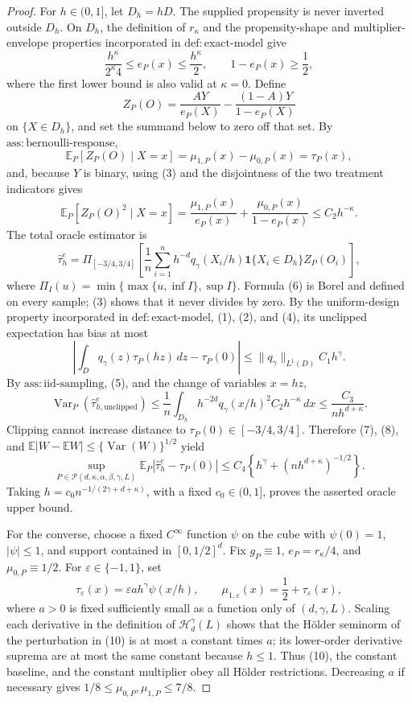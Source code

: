 \documentclass{article}
\begin{document}
\begin{proof}
For \(h\in(0,1]\), let \(D_h=hD\).  The supplied propensity is never inverted outside \(D_h\).  On \(D_h\), the definition of \(r_\kappa\) and the propensity-shape and multiplier-envelope properties incorporated in \(\mathrm{def:exact\mbox{-}model}\) give
\[
 \frac{h^\kappa}{2^\kappa4}\leq e_P(x)\leq\frac{h^\kappa}{2},
 \qquad 1-e_P(x)\geq\frac12,
 \tag{3}
\]
where the first lower bound is also valid at \(\kappa=0\).  Define
\[
 Z_P(O)=\frac{AY}{e_P(X)}-\frac{(1-A)Y}{1-e_P(X)}
\]
on \(\{X\in D_h\}\), and set the summand below to zero off that set.  By \(\mathrm{ass:bernoulli\mbox{-}response}\),
\[
 \mathbb E_P[Z_P(O)\mid X=x]=\mu_{1,P}(x)-\mu_{0,P}(x)=\tau_P(x),
 \tag{4}
\]
and, because \(Y\) is binary, using (3) and the disjointness of the two treatment indicators gives
\[
 \mathbb E_P[Z_P(O)^2\mid X=x]
 =\frac{\mu_{1,P}(x)}{e_P(x)}+\frac{\mu_{0,P}(x)}{1-e_P(x)}
 \leq C_2h^{-\kappa}.
 \tag{5}
\]
The total oracle estimator is
\[
 \widehat\tau^{e}_{h}
 =\Pi_{[-3/4,3/4]}\!\left[
 \frac1n\sum_{i=1}^nh^{-d}q_\gamma(X_i/h)
 \mathbf 1\{X_i\in D_h\}Z_P(O_i)
 \right],
 \tag{6}
\]
where \(\Pi_I(u)=\min\{\max\{u,\inf I\},\sup I\}\).  Formula (6) is Borel and defined on every sample; (3) shows that it never divides by zero.  By the uniform-design property incorporated in \(\mathrm{def:exact\mbox{-}model}\), (1), (2), and (4), its unclipped expectation has bias at most
\[
 \left|\int_Dq_\gamma(z)\tau_P(hz)\,dz-\tau_P(0)\right|
 \leq \lVert q_\gamma\rVert_{L^1(D)}C_1h^\gamma.
 \tag{7}
\]
By \(\mathrm{ass:iid\mbox{-}sampling}\), (5), and the change of variables \(x=hz\),
\[
 \operatorname{Var}_P(\widehat\tau^{e}_{h,\mathrm{unclipped}})
 \leq\frac1n\int_{D_h}h^{-2d}q_\gamma(x/h)^2C_2h^{-\kappa}\,dx
 \leq\frac{C_3}{nh^{d+\kappa}}.
 \tag{8}
\]
Clipping cannot increase distance to \(\tau_P(0)\in[-3/4,3/4]\).  Therefore (7), (8), and \(\mathbb E|W-\mathbb EW|\leq\{\operatorname{Var}(W)\}^{1/2}\) yield
\[
 \sup_{P\in\mathcal P(d,\kappa,\alpha,\beta,\gamma,L)}
 \mathbb E_P|\widehat\tau_h^e-\tau_P(0)|
 \leq C_4\left\{h^\gamma+(nh^{d+\kappa})^{-1/2}\right\}.
 \tag{9}
\]
Taking \(h=c_0n^{-1/(2\gamma+d+\kappa)}\), with a fixed \(c_0\in(0,1]\), proves the asserted oracle upper bound.

For the converse, choose a fixed \(C^\infty\) function \(\psi\) on the cube with \(\psi(0)=1\), \(|\psi|\leq1\), and support contained in \([0,1/2]^d\).  Fix \(g_P\equiv1\), \(e_P=r_\kappa/4\), and \(\mu_{0,P}\equiv1/2\).  For \(\varepsilon\in\{-1,1\}\), set
\[
 \tau_\varepsilon(x)=\varepsilon a h^\gamma\psi(x/h),
 \qquad \mu_{1,\varepsilon}(x)=\frac12+\tau_\varepsilon(x),
 \tag{10}
\]
where \(a>0\) is fixed sufficiently small as a function only of \((d,\gamma,L)\).  Scaling each derivative in the definition of \(\mathcal H_d^\gamma(L)\) shows that the H\"older seminorm of the perturbation in (10) is at most a constant times \(a\); its lower-order derivative suprema are at most the same constant because \(h\leq1\).  Thus (10), the constant baseline, and the constant multiplier obey all H\"older restrictions.  Decreasing \(a\) if necessary gives \(1/8\leq\mu_{0,P},\mu_{1,P}\leq7/8\).


\end{proof}
\end{document}
